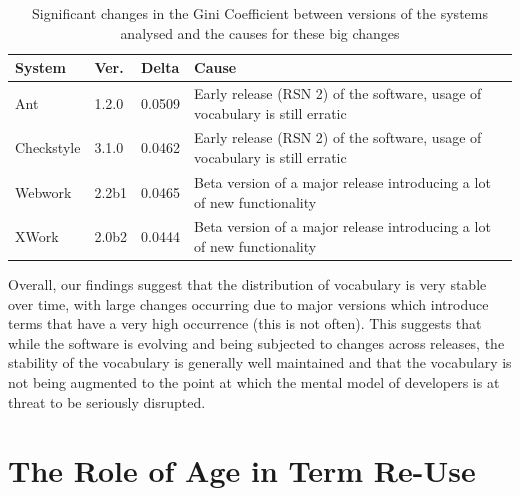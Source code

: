 \begin{table}[t]
\centering
\begin{tabular}{|p{}|p{}|p{}|p{}|}
\hline
{\bf System} & {\bf Ver.} & {\bf Delta} & {\bf Cause}\\
\hline
\hline
Ant
&
1.2.0
&
0.0509
&
Early release (RSN 2) of the software, usage of vocabulary is still erratic
\\
\hline
Checkstyle
&
3.1.0
&
0.0462
&
Early release (RSN 2) of the software, usage of vocabulary is still erratic
\\
\hline
Webwork
&
2.2b1
&
0.0465
&
Beta version of a major release introducing a lot of new functionality
\\
\hline
XWork
&
2.0b2
&
0.0444
&
Beta version of a major release introducing a lot of new functionality
\\
\hline
\end{tabular}
\vspace{0.2cm}
\caption{Significant changes in the Gini Coefficient between versions of the systems analysed and the causes for these big changes}
\label{tab:outstanding_gini_deltas}
\vspace{-0.2cm}
\end{table}

Overall, our findings suggest that the distribution of vocabulary is very stable over time, with large changes occurring due to major versions which introduce terms that have a very high occurrence (this is not often). This suggests that while the software is evolving and being subjected to changes across releases, the stability of the vocabulary is generally well maintained and that the vocabulary is not being augmented to the point at which the mental model of developers is at threat to be seriously disrupted.




\section{The Role of Age in Term Re-Use} %
\label{sec:the_role_of_age_in_term_re_use}

